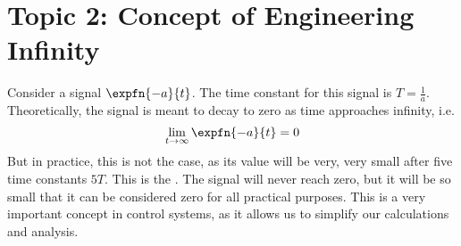 \documentclass[../notes-main.tex]{subfiles}
\begin{document}
\section{Topic 2: Concept of Engineering Infinity}
Consider a signal \(\expfn{-a}{t}\). The time constant for this signal is \(T = \frac{1}{a}\). Theoretically, the signal is meant to decay to zero as time approaches infinity, i.e.
\begin{equation}
    \lim_{t \to \infty} \expfn{-a}{t} = 0 
    \label{eq:eng-infinity}
\end{equation}
But in practice, this is not the case, as its value will be very, very small after five time constants \(5T\). This is the . The signal will never reach zero, but it will be so small that it can be considered zero for all practical purposes. This is a very important concept in control systems, as it allows us to simplify our calculations and analysis.
\end{document}
